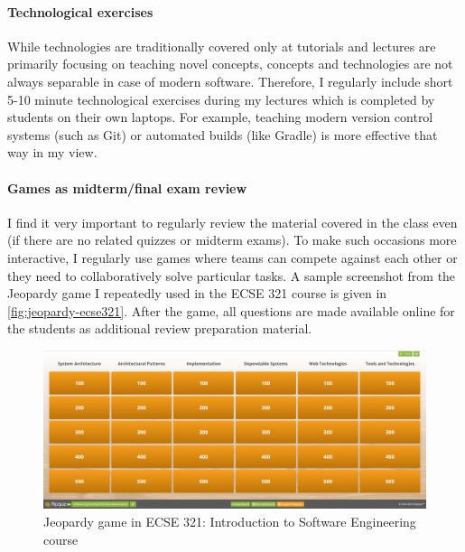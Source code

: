 \paragraph{Technological exercises}
While technologies are traditionally covered only at tutorials and lectures are primarily focusing on teaching novel concepts, concepts and technologies are not always separable in case of modern software. Therefore, I regularly include short 5-10 minute technological exercises during my lectures which is completed by students on their own laptops. For example, teaching modern version control systems (such as Git) or automated builds (like Gradle) is more effective that way in my view. 

\paragraph{Games as midterm/final exam review}
I find it very important to regularly review the material covered in the class even (if there are no related quizzes or midterm exams). To make such occasions more interactive, I regularly use games where teams can compete against each other or they need to collaboratively solve particular tasks. A sample screenshot from the Jeopardy game I repeatedly used in the ECSE 321 course is given in \autoref{fig:jeopardy-ecse321}. After the game, all questions are made available online for the students as additional review preparation material.

\begin{figure}[htb]
\centering
\includegraphics[width=.8\textwidth]{figures/FlipQuiz}
\caption{Jeopardy game in ECSE 321: Introduction to Software Engineering course}
\label{fig:jeopardy-ecse321}
\end{figure}






